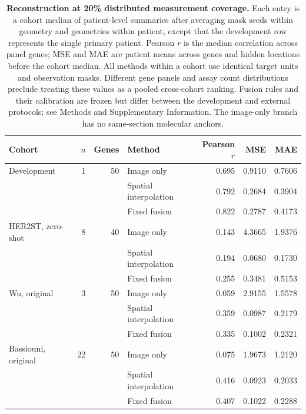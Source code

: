 \begin{table}[!htbp]
\caption{\textbf{Reconstruction at 20\% distributed measurement coverage.} Each entry is a cohort median of patient-level summaries after averaging mask seeds within geometry and geometries within patient, except that the development row represents the single primary patient. Pearson $r$ is the median correlation across panel genes; MSE and MAE are patient means across genes and hidden locations before the cohort median. All methods within a cohort use identical target units and observation masks. Different gene panels and assay count distributions preclude treating these values as a pooled cross-cohort ranking. Fusion rules and their calibration are frozen but differ between the development and external protocols; see Methods and Supplementary Information. The image-only branch has no same-section molecular anchors.}
\label{tab:performance}
\centering\small
\begin{tabularx}{\textwidth}{@{}Yrrlrrr@{}}
\toprule
Cohort & $n$ & Genes & Method & Pearson $r$ & MSE & MAE \\
\midrule
Development & 1 & 50 & Image only & 0.695 & 0.9110 & 0.7606 \\
 &  &  & Spatial interpolation & 0.792 & 0.2684 & 0.3904 \\
 &  &  & Fixed fusion & 0.822 & 0.2787 & 0.4173 \\
\addlinespace[5pt]
HER2ST, zero-shot & 8 & 40 & Image only & 0.143 & 4.3665 & 1.9376 \\
 &  &  & Spatial interpolation & 0.194 & 0.0680 & 0.1730 \\
 &  &  & Fixed fusion & 0.255 & 0.3481 & 0.5153 \\
\addlinespace[5pt]
Wu, original & 3 & 50 & Image only & 0.059 & 2.9155 & 1.5578 \\
 &  &  & Spatial interpolation & 0.359 & 0.0987 & 0.2179 \\
 &  &  & Fixed fusion & 0.335 & 0.1002 & 0.2321 \\
\addlinespace[5pt]
Bassiouni, original & 22 & 50 & Image only & 0.075 & 1.9673 & 1.2120 \\
 &  &  & Spatial interpolation & 0.416 & 0.0923 & 0.2033 \\
 &  &  & Fixed fusion & 0.407 & 0.1022 & 0.2288 \\
\bottomrule
\end{tabularx}
\end{table}
